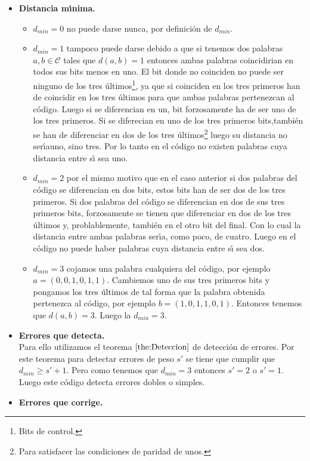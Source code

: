 \begin{itemize}
\item \textbf{Distancia m\'{\i}nima.}
\begin{itemize}
\item $d_{min}=0$ no puede darse nunca, por definici\'on de $d_{min}$.
\item $d_{min}=1$ tampoco puede darse debido a que si tenemos dos palabras
$a,b\in \mathcal{C}$ tales que $d(a,b) = 1$ entonces ambas palabras coincidirian
en todos sus bits menos en uno. El bit donde no coinciden no puede ser ninguno
de los tres \'ultimos\footnote{Bits de control.}, ya que si coinciden en los
tres primeros han de coincidir en los tres \'ultimos para que ambas palabras
pertenezcan al c\'odigo. Luego si se diferencian en un, bit forzosamente ha de
ser uno de los tres primeros. Si se diferecian en uno de los tres primeros bits,tambi\'en se han de diferenciar en dos de los tres \'ultimos\footnote{Para
satisfacer las condiciones de paridad de unos.} luego su distancia no ser\'{\i}auno, sino tres. Por lo tanto en el c\'odigo no existen palabras cuya distancia
entre s\'{\i} sea uno.
\item $d_{min}=2$ por el mismo motivo que en el caso anterior si dos palabras
del c\'odigo se diferencian en dos bits, estos bits han de ser dos de los tres
primeros. Si dos palabras del c\'odigo se diferencian en dos de sus tres
primeros bits, forzosamente se tienen que diferenciar en dos de los tres
\'ultimos y, problablemente, tambi\'en en el otro bit del final. Con lo
cual la distancia entre ambas palabras ser\'{\i}a, como poco, de cuatro. Luego
en el c\'odigo no puede haber palabras cuya distancia entre s\'{\i} sea dos.
\item $d_{min}=3$ cojamos una palabra cualquiera del c\'odigo, por ejemplo
$a=(0,0,1,0,1,1)$. Cambiemos uno de sus tres primeros bits y pongamos los
tres \'ultimos de tal forma que la palabra obtenida pertenezca al c\'odigo, por
ejemplo $b=(1,0,1,1,0,1)$. Entonces tenemos que $d(a,b)=3$. Luego la
$d_{min}=3$.
\end{itemize}
\item \textbf{Errores que detecta.} \\
Para ello utilizamos el teorema $\ref{the:Deteccion}$ de detecci\'on de errores.
Por este teorema para detectar errores de peso $s'$ se tiene que cumplir que
$d_{min}\geq s'+1$. Pero como tenemos que $d_{min}=3$ entonces $s'=2$ o $s'=1$.
Luego este c\'odigo detecta errores dobles o simples.
\item \textbf{Errores que corrige.} \\

\end{itemize}
